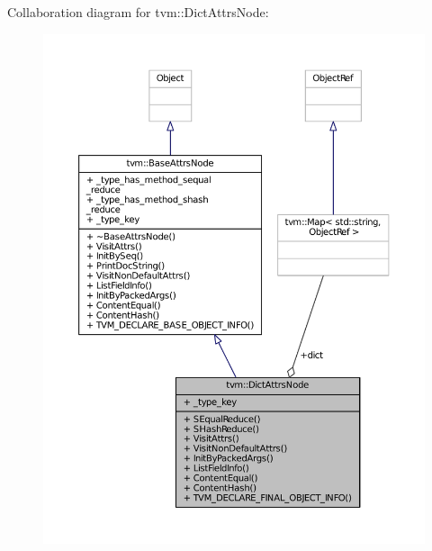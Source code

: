 Collaboration diagram for tvm\+:\+:Dict\+Attrs\+Node\+:
\nopagebreak
\begin{figure}[H]
\begin{center}
\leavevmode
\includegraphics[width=350pt]{classtvm_1_1DictAttrsNode__coll__graph}
\end{center}
\end{figure}

